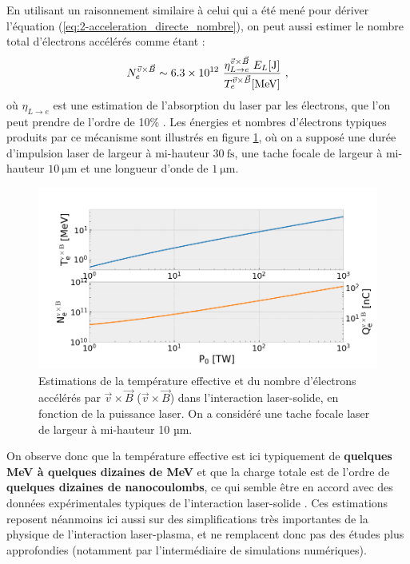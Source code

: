 \begin{refsection}
En utilisant un raisonnement similaire à celui qui a été mené pour dériver l'équation (\ref{eq:2-acceleration_directe_nombre}), on peut aussi estimer le nombre total d'électrons accélérés comme étant :
\begin{equation}
    N_e^{\vec{v} \times \vec{B}} \sim 6.3 \times 10^{12} ~ \dfrac{\eta_{L \to e}^{\vec{v} \times \vec{B}} ~  E_L \si{[J]}}{T_e^{\vec{v} \times \vec{B}} \si{[MeV]}} ~ \rm ,
\end{equation}
où $\eta_{L\to e}$ est une estimation de l'absorption du laser par les électrons, que l'on peut prendre de l'ordre de 10\% \parencite{price_1995, malka_1996}. Les énergies et nombres d'électrons typiques produits par ce mécanisme sont illustrés en figure \ref{fig:2-scaling_ponderomoteur}, où on a supposé une durée d'impulsion laser de largeur à mi-hauteur $30 ~ \si{\fs}$, une tache focale de largeur à mi-hauteur $10 ~ \si{\um}$ et une longueur d'onde de $1 ~ \si{\um}$. 
\begin{figure}[hbtp]
    \centering
    \includegraphics[width=0.7\linewidth]{2-laser/scaling_ponderomoteur.png}
    \caption{Estimations de la température effective et du nombre d'électrons accélérés par $\vec{v} \times \vec{B}$ ($\vec{v} \times \vec{B}$) dans l'interaction laser-solide, en fonction de la puissance laser. On a considéré une tache focale laser de largeur à mi-hauteur 10 µm.}
    \label{fig:2-scaling_ponderomoteur}
\end{figure}

On observe donc que la température effective est ici typiquement de \textbf{quelques MeV à quelques dizaines de MeV} et que la charge totale est de l'ordre de \textbf{quelques dizaines de nanocoulombs}, ce qui semble être en accord avec des données expérimentales typiques de l'interaction laser-solide \parencite{malka_1996, dubois_2014}. Ces estimations reposent néanmoins ici aussi sur des simplifications très importantes de la physique de l'interaction laser-plasma, et ne remplacent donc pas des études plus approfondies (notamment par l'intermédiaire de simulations numériques).


\end{refsection}
